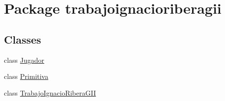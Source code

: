 \hypertarget{namespacetrabajoignacioriberagii}{}\section{Package trabajoignacioriberagii}
\label{namespacetrabajoignacioriberagii}
\subsection*{Classes}
\begin{DoxyCompactItemize}
\item 
class \mbox{\hyperlink{classtrabajoignacioriberagii_1_1_jugador}{Jugador}}
\item 
class \mbox{\hyperlink{classtrabajoignacioriberagii_1_1_primitiva}{Primitiva}}
\item 
class \mbox{\hyperlink{classtrabajoignacioriberagii_1_1_trabajo_ignacio_ribera_g_i_i}{Trabajo\+Ignacio\+Ribera\+G\+II}}
\end{DoxyCompactItemize}
